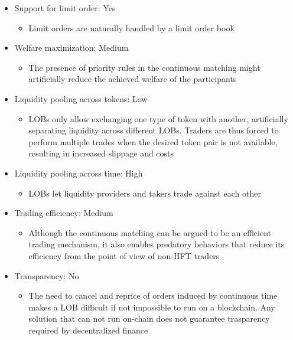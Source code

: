 \documentclass[11pt, reqno]{amsart}
\theoremstyle{definition}
\theoremstyle{remark}
\begin{document}
\begin{itemize}
	\item Support for limit order: Yes
	      \begin{itemize}
		      \item Limit orders are naturally handled by a limit order book
	      \end{itemize}
	\item Welfare maximization: Medium
	      \begin{itemize}
		      \item The presence of priority rules in the continuous matching
                might artificially reduce the achieved welfare of the participants
	      \end{itemize}
	\item Liquidity pooling across tokens: Low
	      \begin{itemize}
		      \item LOBs only allow exchanging one type of token with another,
                artificially separating liquidity across different LOBs. 
                Traders are thus forced to perform multiple trades when the
                desired token pair is not available, resulting in increased
                slippage and costs
	      \end{itemize}
	\item Liquidity pooling across time: High
	      \begin{itemize}
		      \item LOBs let liquidity providers and takers trade against each other
	      \end{itemize}
	\item Trading efficiency: Medium
	      \begin{itemize}
              \item Although the continuous matching can be argued to be an efficient
                trading mechanism, it also enables predatory behaviors that reduce
                its efficiency from the point of view of non-HFT traders
	      \end{itemize}
	\item Transparency: No
	      \begin{itemize}
		      \item The need to cancel and reprice of orders induced by continuous
                time makes a LOB difficult if not impossible to run on a blockchain.
                Any solution that can not run on-chain does not guarantee trasparency
                required by decentralized finance

\end{itemize}
\end{itemize}
\end{document}
